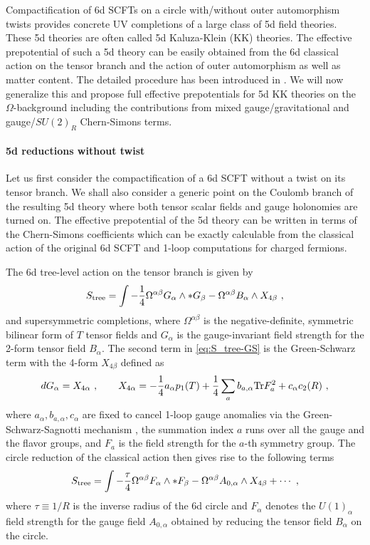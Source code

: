 Compactification of 6d SCFTs on a circle with/without outer automorphism twists provides concrete UV completions of a large class of 5d field theories. These 5d theories are often called 5d Kaluza-Klein (KK) theories. The effective prepotential of such a 5d theory can be easily obtained from the 6d classical action on the tensor branch and the action of outer automorphism as well as matter content. The detailed procedure has been introduced in \cite{Bhardwaj:2019fzv}. We will now generalize this and propose full effective prepotentials for 5d KK theories on the $\Omega$-background including the contributions from mixed gauge/gravitational and gauge/$SU(2)_R$ Chern-Simons terms.

\paragraph{5d reductions without twist}
Let us first consider the compactification of a 6d SCFT without a twist on its tensor branch. We shall also consider a generic point on the Coulomb branch of the resulting 5d theory where both tensor scalar fields and gauge holonomies are turned on. The effective prepotential of the 5d theory can be written in terms of the Chern-Simons coefficients which can be exactly calculable from the classical action of the original 6d SCFT and 1-loop computations for charged fermions.

The 6d tree-level action on the tensor branch is given by
\begin{equation}
	S_{\rm tree}=\int -\frac{1}{4}\Omega^{\alpha\beta} G_\alpha \wedge * G_\beta - \Omega^{\alpha\beta}B_{\alpha} \wedge X_{4\beta} \ , \label{eq:S_tree-GS}
\end{equation}
and supersymmetric completions, where $\Omega^{\alpha\beta}$ is the negative-definite, symmetric bilinear form of $T$ tensor fields and $G_\alpha$ is the gauge-invariant field strength for the 2-form tensor field $B_\alpha$. The second term in \eqref{eq:S_tree-GS} is the Green-Schwarz term with the 4-form $X_{4\beta}$ defined as
\begin{equation}
	dG_\alpha = X_{4\alpha} \ , \qquad X_{4\alpha} = -\frac{1}{4}a_\alpha p_1(T) +\frac{1}{4}\sum_a b_{a,\alpha}{\rm Tr}F_{a}^2 +c_\alpha c_2(R) \ ,
\end{equation}
where $a_\alpha,b_{a,\alpha}, c_\alpha$ are fixed to cancel 1-loop gauge anomalies via the Green-Schwarz-Sagnotti mechanism \cite{Sagnotti:1992qw}, the summation index $a$ runs over all the gauge and the flavor groups, and $F_a$ is the field strength for the $a$-th symmetry group. The circle reduction of the classical action then gives rise to the following terms
\begin{equation}
	S_{\rm tree} = \int -\frac{\tau}{4} \Omega^{\alpha\beta} F_{\alpha}\wedge *F_\beta - \Omega^{\alpha\beta}A_{0,\alpha} \wedge X_{4\beta} + \cdots \ ,
\end{equation}
where $\tau\equiv 1/R$ is the inverse radius of the 6d circle and $F_{\alpha}$ denotes the $U(1)_\alpha$ field strength for the gauge field $A_{0,\alpha}$ obtained by reducing the tensor field $B_\alpha$ on the circle.

